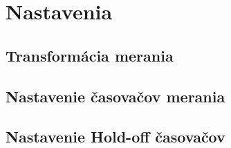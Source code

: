 \documentclass[main.tex]{subfiles}
\begin{document}
	\section{Nastavenia}
		\begin{multicols*}{2}
			
			\subsection{Transformácia merania}
			
			
			\subsection{Nastavenie časovačov merania}
			
			
			\subsection{Nastavenie Hold-off časovačov}
			
		\end{multicols*}
\end{document}
